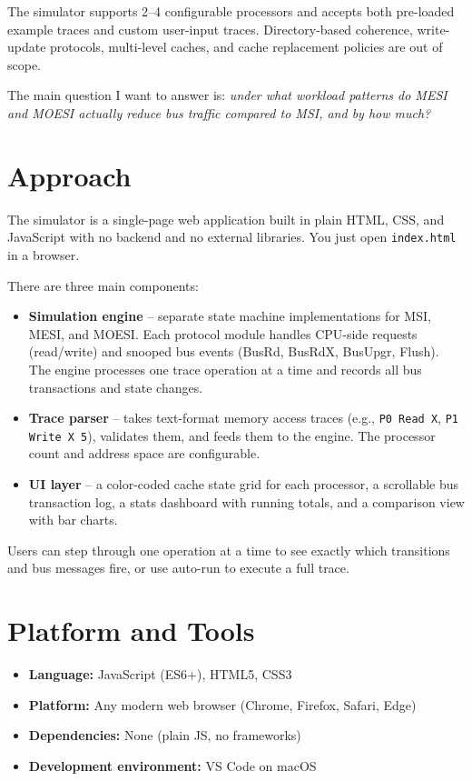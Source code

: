 \documentclass[11pt]{article}
\begin{document}
The simulator supports 2--4 configurable processors and accepts both pre-loaded example traces and custom user-input traces. Directory-based coherence, write-update protocols, multi-level caches, and cache replacement policies are out of scope.

The main question I want to answer is: \textit{under what workload patterns do MESI and MOESI actually reduce bus traffic compared to MSI, and by how much?}

\section{Approach}

The simulator is a single-page web application built in plain HTML, CSS, and JavaScript with no backend and no external libraries. You just open \texttt{index.html} in a browser.

There are three main components:

\begin{itemize}[nosep]
    \item \textbf{Simulation engine} -- separate state machine implementations for MSI, MESI, and MOESI. Each protocol module handles CPU-side requests (read/write) and snooped bus events (BusRd, BusRdX, BusUpgr, Flush). The engine processes one trace operation at a time and records all bus transactions and state changes.
    \item \textbf{Trace parser} -- takes text-format memory access traces (e.g., \texttt{P0 Read X}, \texttt{P1 Write X 5}), validates them, and feeds them to the engine. The processor count and address space are configurable.
    \item \textbf{UI layer} -- a color-coded cache state grid for each processor, a scrollable bus transaction log, a stats dashboard with running totals, and a comparison view with bar charts.
\end{itemize}

Users can step through one operation at a time to see exactly which transitions and bus messages fire, or use auto-run to execute a full trace.

\section{Platform and Tools}

\begin{itemize}[nosep]
    \item \textbf{Language:} JavaScript (ES6+), HTML5, CSS3
    \item \textbf{Platform:} Any modern web browser (Chrome, Firefox, Safari, Edge)
    \item \textbf{Dependencies:} None (plain JS, no frameworks)
    \item \textbf{Development environment:} VS Code on macOS
\end{itemize}
\end{document}
